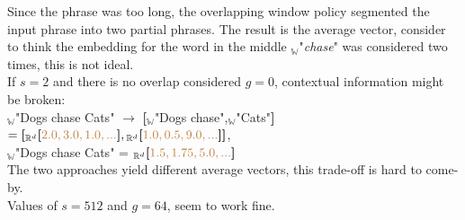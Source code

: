 \documentclass[a4paper,fleqn]{cas-sc}
\begin{document}
\noindent
Since the phrase was too long, the overlapping window policy segmented the input phrase into two partial phrases. 
The result is the average vector, consider to think the embedding for the word in the middle 
${}_{\mathbb{W}}$"\color{brown}\textit{chase}\color{black}" was considered two times, this is not ideal. \\

If $s=2$ and there is no overlap considered $g=0$, contextual information might be broken: \\
${}_{\mathbb{W}}$"\color{brown}Dogs chase Cats\color{black}" 
$\rightarrow$ 
\textbf{[}${}_{\mathbb{W}}$"\color{brown}Dogs chase\color{black}",${}_{\mathbb{W}}$"\color{brown}Cats\color{black}"\textbf{]} 
$=\textbf{[}{}_{\mathbb{R}^d}\textbf{[}\color{brown}2.0,3.0,1.0,...\color{black}\textbf{]}, 
{}_{\mathbb{R}^d}\textbf{[}\color{brown}1.0,0.5,9.0,...\color{black}\textbf{]}\textbf{]}$, \\
${}_{\mathbb{W}}$"\color{brown}Dogs chase Cats\color{black}" = ${}_{\mathbb{R}^d}\textbf{[}\color{brown}1.5,1.75,5.0,...\color{black}\textbf{]}$\\

\noindent
The two approaches yield different average vectors, this trade-off is hard to come-by. \\
Values of $s=512$ and $g=64$, seem to work fine. \\ 
\end{document}

